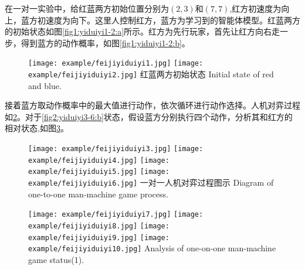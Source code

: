 在一对一实验中，给红蓝两方初始位置分别为$(2,3)$和$(7,7)$,红方初速度为向上，蓝方初速度为向下。这里人控制红方，蓝方为学习到的智能体模型。红蓝两方的初始状态如图\ref{fig1:yiduiyi1-2:a}所示。红方为先行玩家，首先让红方向右走一步，得到蓝方的动作概率，如图\ref{fig1:yiduiyi1-2:b}。


\begin{figure}[htpb]
	\centering
	\subcaptionbox{\label{fig1:yiduiyi1-2:a}}
	{\texttt{[image: example/feijiyiduiyi1.jpg]}}
	\subcaptionbox{\label{fig1:yiduiyi1-2:b}}
	{\texttt{[image: example/feijiyiduiyi2.jpg]}}
	\bicaption
	{红蓝两方初始状态}
	{Initial state of red and blue.}
	\label{fig1:yiduiyi1-2}
\end{figure}


接着蓝方取动作概率中的最大值进行动作，依次循环进行动作选择。人机对弈过程如\ref{fig2:yiduiyi3-6}。对于\ref{fig2:yiduiyi3-6:b}状态，假设蓝方分别执行四个动作，分析其和红方的相对状态,如图\ref{fig2:yiduiyi7-10}。

\begin{figure}[htp]
	\centering
	\subcaptionbox{\label{fig2:yiduiyi3-6:a}}
	{\texttt{[image: example/feijiyiduiyi3.jpg]}}
	\subcaptionbox{\label{fig2:yiduiyi3-6:b}}
	{\texttt{[image: example/feijiyiduiyi4.jpg]}}
	\newline
	\centering
	\subcaptionbox{\label{fig2:yiduiyi3-6:c}}
	{\texttt{[image: example/feijiyiduiyi5.jpg]}}
	\subcaptionbox{\label{fig2:yiduiyi3-6:d}}
	{\texttt{[image: example/feijiyiduiyi6.jpg]}}
	\bicaption
	{一对一人机对弈过程图示}
	{Diagram of one-to-one man-machine game process.}
	\label{fig2:yiduiyi3-6}
\end{figure}


\begin{figure}[htbp]
	\centering
	{\texttt{[image: example/feijiyiduiyi7.jpg]}}
	\hspace{0.5em}
	{\texttt{[image: example/feijiyiduiyi8.jpg]}}
	\newline
	\centering
	{\texttt{[image: example/feijiyiduiyi9.jpg]}}
	\hspace{0.5em}
	{\texttt{[image: example/feijiyiduiyi10.jpg]}}
	{Analysis of one-on-one man-machine game status(1).}
	\label{fig2:yiduiyi7-10}
\end{figure}

